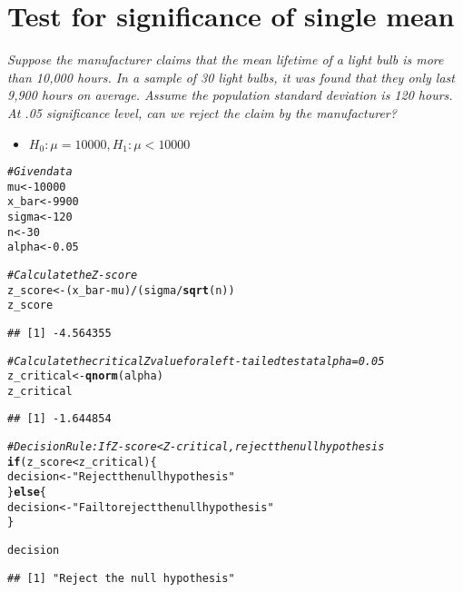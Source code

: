 \documentclass{article}\usepackage[]{graphicx}\usepackage[]{xcolor}
\makeatletter
\newcommand{\hlnum}[1]{\textcolor[rgb]{0.686,0.059,0.569}{#1}}%
\newcommand{\hlsng}[1]{\textcolor[rgb]{0.192,0.494,0.8}{#1}}%
\newcommand{\hlcom}[1]{\textcolor[rgb]{0.678,0.584,0.686}{\textit{#1}}}%
\newcommand{\hlopt}[1]{\textcolor[rgb]{0,0,0}{#1}}%
\newcommand{\hldef}[1]{\textcolor[rgb]{0.345,0.345,0.345}{#1}}%
\newcommand{\hlkwa}[1]{\textcolor[rgb]{0.161,0.373,0.58}{\textbf{#1}}}%
\newcommand{\hlkwb}[1]{\textcolor[rgb]{0.69,0.353,0.396}{#1}}%
\newcommand{\hlkwd}[1]{\textcolor[rgb]{0.737,0.353,0.396}{\textbf{#1}}}%
\newenvironment{kframe}{%
 \def\at@end@of@kframe{}%
 \ifinner\ifhmode%
  \def\at@end@of@kframe{\end{minipage}}%
  \begin{minipage}{\columnwidth}%
 \fi\fi%
 \def\FrameCommand##1{\hskip\@totalleftmargin \hskip-\fboxsep
 \colorbox{shadecolor}{##1}\hskip-\fboxsep
     \hskip-\linewidth \hskip-\@totalleftmargin \hskip\columnwidth}%
 \MakeFramed {\advance\hsize-\width
   \@totalleftmargin\z@ \linewidth\hsize
   \@setminipage}}%
 {\par\unskip\endMakeFramed%
 \at@end@of@kframe}
\newenvironment{knitrout}{}{} %
\makeatother
\begin{document}
\section*{Test for significance of single mean}
\emph{Suppose the manufacturer claims that the mean lifetime of a light bulb is more
than 10,000 hours. In a sample of 30 light bulbs, it was found that they only last
9,900 hours on average. Assume the population standard deviation is 120 hours.
At .05 significance level, can we reject the claim by the manufacturer?
}\\
\begin{itemize}
  \item $H_0:\mu =10000, H_1: \mu <10000$
\end{itemize}
\begin{knitrout}
\color{fgcolor}\begin{kframe}
\begin{alltt}
\hlcom{# Given data}
\hldef{mu} \hlkwb{<-} \hlnum{10000}
\hldef{x_bar} \hlkwb{<-} \hlnum{9900}
\hldef{sigma} \hlkwb{<-} \hlnum{120}
\hldef{n} \hlkwb{<-} \hlnum{30}
\hldef{alpha} \hlkwb{<-} \hlnum{0.05}

\hlcom{# Calculate the Z-score}
\hldef{z_score} \hlkwb{<-} \hldef{(x_bar} \hlopt{-} \hldef{mu)} \hlopt{/} \hldef{(sigma} \hlopt{/} \hlkwd{sqrt}\hldef{(n))}
\hldef{z_score}
\end{alltt}
\begin{verbatim}
## [1] -4.564355
\end{verbatim}
\begin{alltt}
\hlcom{# Calculate the critical Z value for a left-tailed test at alpha = 0.05}
\hldef{z_critical} \hlkwb{<-} \hlkwd{qnorm}\hldef{(alpha)}
\hldef{z_critical}
\end{alltt}
\begin{verbatim}
## [1] -1.644854
\end{verbatim}
\begin{alltt}
\hlcom{# Decision Rule: If Z-score < Z-critical, reject the null hypothesis}
\hlkwa{if} \hldef{(z_score} \hlopt{<} \hldef{z_critical) \{}
  \hldef{decision} \hlkwb{<-} \hlsng{"Reject the null hypothesis"}
\hldef{\}} \hlkwa{else} \hldef{\{}
  \hldef{decision} \hlkwb{<-} \hlsng{"Fail to reject the null hypothesis"}
\hldef{\}}

\hldef{decision}
\end{alltt}
\begin{verbatim}
## [1] "Reject the null hypothesis"
\end{verbatim}
\end{kframe}
\end{knitrout}
\end{document}
